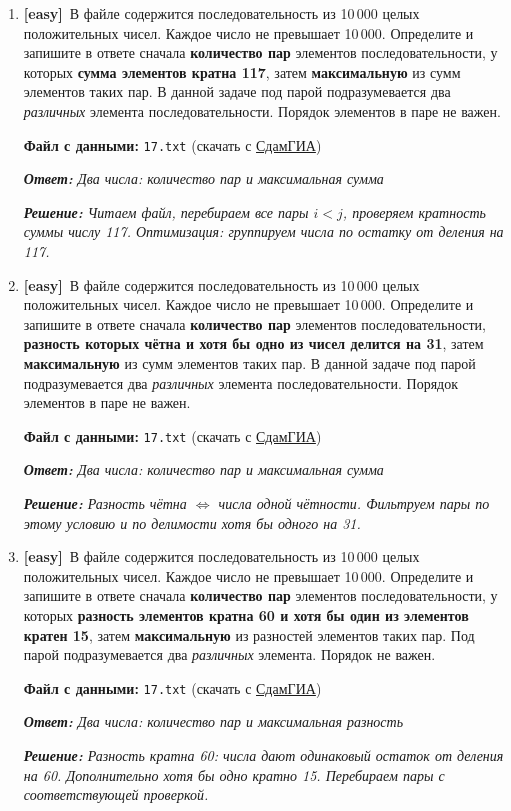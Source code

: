 \documentclass[a4paper]{article}
\newcommand{\easytag}{\textcolor{easycolor}{\textbf{[easy]}}}
\newcommand{\answer}[1]{\par\smallskip\textit{\textbf{Ответ:} #1}}
\newcommand{\solution}[1]{\par\textit{\textbf{Решение:} #1}}
\newcommand{\filehint}[1]{\par\smallskip\textbf{Файл с данными:} \texttt{#1} (скачать с \href{https://inf-ege.sdamgia.ru/}{СдамГИА})}
\begin{document}
\begin{enumerate}[label=\textbf{Задача \arabic*.}, leftmargin=*, itemsep=10mm]

  \item %
  \easytag\ В файле содержится последовательность из 10\,000 целых положительных чисел.
  Каждое число не превышает 10\,000.
  Определите и запишите в ответе сначала \textbf{количество пар} элементов
  последовательности, у которых \textbf{сумма элементов кратна 117},
  затем \textbf{максимальную} из сумм элементов таких пар.
  В данной задаче под парой подразумевается два \emph{различных} элемента
  последовательности. Порядок элементов в паре не важен.
  \filehint{17.txt}
  \answer{Два числа: количество пар и максимальная сумма}
  \solution{
  Читаем файл, перебираем все пары $i < j$, проверяем кратность суммы числу 117.
  Оптимизация: группируем числа по остатку от деления на 117.}

  \bigskip

  \item %
  \easytag\ В файле содержится последовательность из 10\,000 целых положительных чисел.
  Каждое число не превышает 10\,000.
  Определите и запишите в ответе сначала \textbf{количество пар} элементов
  последовательности, \textbf{разность которых чётна и хотя бы одно из чисел
  делится на 31}, затем \textbf{максимальную} из сумм элементов таких пар.
  В данной задаче под парой подразумевается два \emph{различных} элемента
  последовательности. Порядок элементов в паре не важен.
  \filehint{17.txt}
  \answer{Два числа: количество пар и максимальная сумма}
  \solution{Разность чётна $\Leftrightarrow$ числа одной чётности. Фильтруем пары по этому условию и по делимости хотя бы одного на 31.}

  \bigskip

  \item %
  \easytag\ В файле содержится последовательность из 10\,000 целых положительных чисел.
  Каждое число не превышает 10\,000.
  Определите и запишите в ответе сначала \textbf{количество пар} элементов
  последовательности, у которых \textbf{разность элементов кратна 60 и хотя бы
  один из элементов кратен 15}, затем \textbf{максимальную} из разностей элементов
  таких пар. Под парой подразумевается два \emph{различных} элемента.
  Порядок не важен.
  \filehint{17.txt}
  \answer{Два числа: количество пар и максимальная разность}
  \solution{Разность кратна 60: числа дают одинаковый остаток от деления на 60. Дополнительно хотя бы одно кратно 15. Перебираем пары с соответствующей проверкой.}


\end{enumerate}
\end{document}
